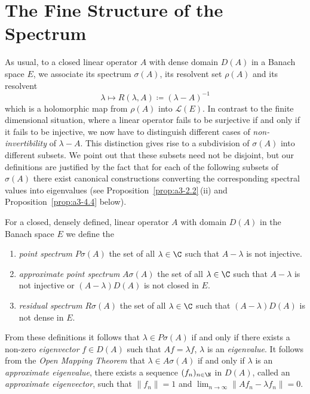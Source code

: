 \section{The Fine Structure of the Spectrum}\label{sec:a3-2}%
As usual, to a closed linear operator $A$ with dense domain $D(A)$ in a Banach space $E$, we associate its spectrum $\sigma(A)$, its resolvent set
$\rho(A)$ and its resolvent 
\[
    \lambda \mapsto R(\lambda,A) \coloneq (\lambda - A)^{-1}
\]
which is a holomorphic map from $\rho(A)$ into $\mathcal{L}(E)$.
In contrast to the finite dimensional situation, where a linear operator fails to be surjective if and only if it fails to be injective, we now have to distinguish different cases of \emph{non-invertibility} of\/ $\lambda - A$.
This distinction gives rise to a subdivision of\/ $\sigma(A)$ into different subsets.
We point out that these subsets need not be disjoint, but our definitions are
justified by the fact that for each of the following subsets of\/ $\sigma(A)$ there exist canonical constructions converting the corresponding spectral values into eigenvalues (see Proposition~\ref{prop:a3-2.2}\,(ii) and Proposition~\ref{prop:a3-4.4} below).
\begin{definition}\label{def:a3-2.1}
For a closed, densely defined, linear operator $A$ with domain $D(A)$ in the Banach space $E$ we define the
\begin{enumerate}[\upshape (i)]
\item 
\emph{point spectrum} $P\sigma(A)$ the set of all $\lambda \in \C$ such that 
$A - \lambda$ is not injective.

\item 
\emph{approximate point spectrum}
$A\sigma(A)$ the set of all $\lambda \in \C$ such that $A - \lambda$ is not injective or $(A - \lambda)D(A)$ is not closed in $E$. 

\item 
\emph{residual spectrum} $R\sigma(A)$ the set of all $\lambda \in \C$ such that $(A - \lambda)D(A)$ is not dense in $E$.
\end{enumerate}
\end{definition}
From these definitions it follows that $\lambda \in P\sigma(A)$ if and only if there exists a non-zero \emph{eigenvector}%
$f \in D(A)$ such that $Af = \lambda f$, \ie $\lambda$ is an \emph{eigenvalue}.
It follows from the \emph{Open Mapping Theorem} that $\lambda \in A\sigma(A)$ if and only if\/ $\lambda$ is an \emph{approximate eigenvalue}, 
\ie there exists a sequence $(f_{n})_{n \in \N}$ in $D(A)$, called an \emph{approximate eigenvector}, 
such that $\|f_{n}\| = 1$ and $ \lim_{n \to \infty} \|Af_{n} - \lambda f_{n}\| = 0$.

